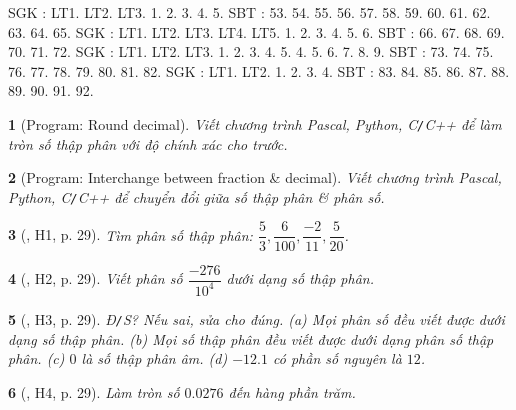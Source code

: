 \documentclass{article}
\newtheorem{baitoan}{}
\begin{document}
\noindent SGK \cite[Chap. V, \S5, pp. 44--47]{SGK_Toan_6_Canh_Dieu_tap_2}: LT1. LT2. LT3. 1. 2. 3. 4. 5. SBT \cite[Chap. V, \S5, pp. 44--45]{SBT_Toan_6_Canh_Dieu_tap_2}: 53. 54. 55. 56. 57. 58. 59. 60. 61. 62. 63. 64. 65. SGK \cite[Chap. V, \S6, pp. 48--51]{SGK_Toan_6_Canh_Dieu_tap_2}: LT1. LT2. LT3. LT4. LT5. 1. 2. 3. 4. 5. 6. SBT \cite[Chap. V, \S5, pp. 46--48]{SBT_Toan_6_Canh_Dieu_tap_2}: 66. 67. 68. 69. 70. 71. 72. SGK \cite[Chap. V, \S7, pp. 52--56]{SGK_Toan_6_Canh_Dieu_tap_2}: LT1. LT2. LT3. 1. 2. 3. 4. 5. 4. 5. 6. 7. 8. 9. SBT \cite[Chap. V, \S7, pp. 49--50]{SBT_Toan_6_Canh_Dieu_tap_2}: 73. 74. 75. 76. 77. 78. 79. 80. 81. 82. SGK \cite[Chap. V, \S8, pp. 57--60]{SGK_Toan_6_Canh_Dieu_tap_2}: LT1. LT2. 1. 2. 3. 4. SBT \cite[Chap. V, \S8, pp. 51--52]{SBT_Toan_6_Canh_Dieu_tap_2}: 83. 84. 85. 86. 87. 88. 89. 90. 91. 92.

\begin{baitoan}[{\sf Program}: Round decimal]
	Viết chương trình {\sf Pascal, Python, C{\tt/}C++} để làm tròn số thập phân với độ chính xác cho trước.
\end{baitoan}

\begin{baitoan}[{\sf Program}: Interchange between fraction \& decimal]
	Viết chương trình {\sf Pascal, Python, C{\tt/}C++} để chuyển đổi giữa số thập phân \& phân số.
\end{baitoan}

\begin{baitoan}[\cite{Binh_boi_duong_Toan_6_tap_2}, H1, p. 29]
	Tìm phân số thập phân: $\dfrac{5}{3},\dfrac{6}{100},\dfrac{-2}{11},\dfrac{5}{20}$.
\end{baitoan}

\begin{baitoan}[\cite{Binh_boi_duong_Toan_6_tap_2}, H2, p. 29]
	Viết phân số $\dfrac{-276}{10^4}$ dưới dạng số thập phân.
\end{baitoan}

\begin{baitoan}[\cite{Binh_boi_duong_Toan_6_tap_2}, H3, p. 29]
	{\rm Đ{\tt/}S?} Nếu sai, sửa cho đúng. (a) Mọi phân số đều viết được dưới dạng số thập phân. (b) Mọi số thập phân đều viết được dưới dạng phân số thập phân. (c) $0$ là số thập phân âm. (d) $-12.1$ có phần số nguyên là $12$.
\end{baitoan}

\begin{baitoan}[\cite{Binh_boi_duong_Toan_6_tap_2}, H4, p. 29]
	Làm tròn số $0.0276$ đến hàng phần trăm.
\end{baitoan}
\end{document}
